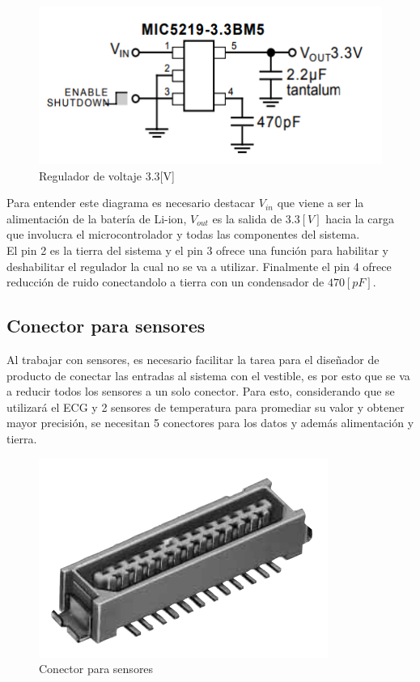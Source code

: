 \begin{figure}[H]
\centering
\includegraphics[scale=1]{figuras/eagle/reg.png}
\caption{Regulador de voltaje 3.3[V]}
\label{reg}
\end{figure}

Para entender este diagrama es necesario destacar $V_{in}$ que viene a ser la alimentación de la batería de Li-ion, $V_{out}$ es la salida de $3.3[V]$ hacia la carga que involucra el microcontrolador y todas las componentes del sistema.\\
El pin 2 es la tierra del sistema y el pin 3 ofrece una función para habilitar y deshabilitar el regulador la cual no se va a utilizar. Finalmente el pin 4 ofrece reducción de ruido conectandolo a tierra con un condensador de $470[pF]$.

\subsection{Conector para sensores}
Al trabajar con sensores, es necesario facilitar la tarea para el diseñador de producto de conectar las entradas al sistema con el vestible, es por esto que se va a reducir todos los sensores a un solo conector. Para esto, considerando que se utilizará el ECG y 2 sensores de temperatura para promediar su valor y obtener mayor precisión, se necesitan 5 conectores para los datos y además alimentación y tierra.\\

\begin{figure}[H]
\centering
\includegraphics[scale=0.5]{figuras/eagle/conn.png}
\caption{Conector para sensores}
\label{conector}
\end{figure}

